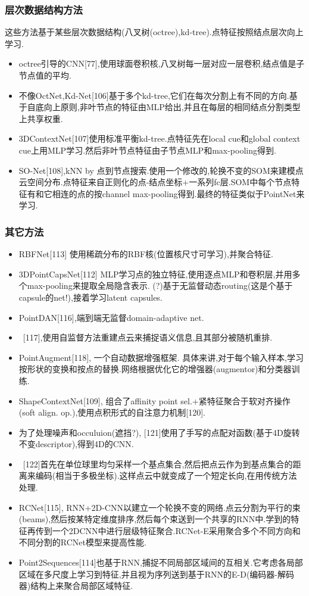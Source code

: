 \documentclass{article}
\begin{document}
\subsubsection{层次数据结构方法}
这些方法基于某些层次数据结构(八叉树(octree),kd-tree).点特征按照结点层次向上学习.
\begin{itemize}
    \item octree引导的CNN[77],使用球面卷积核,八叉树每一层对应一层卷积,结点值是子节点值的平均.
    \item 不像OctNet,Kd-Net[106]基于多个kd-tree,它们在每次分割上有不同的方向.基于自底向上原则,非叶节点的特征由MLP给出,并且在每层的相同结点分割类型上共享权重.
    \item 3DContextNet[107]使用标准平衡kd-tree.点特征先在local cue和global context cue上用MLP学习.然后非叶节点特征由子节点MLP和max-pooling得到.
    \item SO-Net[108],kNN by 点到节点搜索.使用一个修改的,轮换不变的SOM来建模点云空间分布.点特征来自正则化的点-结点坐标+一系列fc层.SOM中每个节点特征有和它相连的点的按channel max-pooling得到.最终的特征类似于PointNet来学习.
\end{itemize}
\subsubsection{其它方法}

\begin{itemize}
    \item RBFNet[113] 使用稀疏分布的RBF核(位置核尺寸可学习),并聚合特征.
    \item 3DPointCapsNet[112] MLP学习点的独立特征,使用逐点MLP和卷积层,并用多个max-pooling来提取全局隐含表示. (?)基于无监督动态routing(这是个基于capsule的net!),接着学习latent capsules.
    \item PointDAN[116],端到端无监督domain-adaptive net. 
    \item \ [117],使用自监督方法重建点云来捕捉语义信息,且其部分被随机重排.
    \item PointAugment[118], 一个自动数据增强框架. 具体来讲,对于每个输入样本,学习按形状的变换和按点的替换.网络根据优化它的增强器(augmentor)和分类器训练.
    \item ShapeContextNet[109], 组合了affinity point sel.+紧特征聚合于软对齐操作(soft align. op.),使用点积形式的自注意力机制[120].
    \item 为了处理噪声和occuluion(遮挡?), [121]使用了手写的点配对函数(基于4D旋转不变descriptor),得到4D的CNN.
    \item \ [122]首先在单位球里均匀采样一个基点集合,然后把点云作为到基点集合的距离来编码(相当于多极坐标).这样点云中就变成了一个短定长向,在用传统方法处理.
    \item RCNet[115], RNN+2D-CNN以建立一个轮换不变的网络.点云分割为平行的束(beams),然后按某特定维度排序,然后每个束送到一个共享的RNN中.学到的特征再传到一个2DCNN中进行层级特征聚合.RCNet-E采用聚合多个不同方向和不同分割的RCNet模型来提高性能.
    \item Point2Sequences[114]也基于RNN,捕捉不同局部区域间的互相关.它考虑各局部区域在多尺度上学习到特征,并且视为序列送到基于RNN的E-D(编码器-解码器)结构上来聚合局部区域特征.
\end{itemize}
\end{document}

